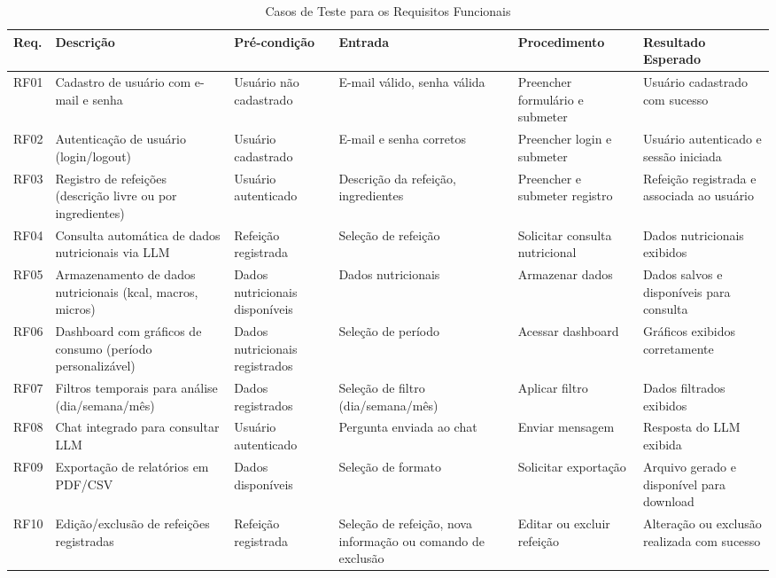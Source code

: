 \begin{longtable}{|p{}|p{}|p{}|p{}|p{}|p{}|}
\caption{Casos de Teste para os Requisitos Funcionais}
\label{tab:casos-teste-reqs-funcionais}\\
\hline
\textbf{Req.} & \textbf{Descrição} & \textbf{Pré-condição} & \textbf{Entrada} & \textbf{Procedimento} & \textbf{Resultado Esperado} \\
\hline
\endfirsthead
\endhead
RF01 & Cadastro de usuário com e-mail e senha & Usuário não cadastrado & E-mail válido, senha válida & Preencher formulário e submeter & Usuário cadastrado com sucesso \\
\hline
RF02 & Autenticação de usuário (login/logout) & Usuário cadastrado & E-mail e senha corretos & Preencher login e submeter & Usuário autenticado e sessão iniciada \\
\hline
RF03 & Registro de refeições (descrição livre ou por ingredientes) & Usuário autenticado & Descrição da refeição, ingredientes & Preencher e submeter registro & Refeição registrada e associada ao usuário \\
\hline
RF04 & Consulta automática de dados nutricionais via LLM & Refeição registrada & Seleção de refeição & Solicitar consulta nutricional & Dados nutricionais exibidos \\
\hline
RF05 & Armazenamento de dados nutricionais (kcal, macros, micros) & Dados nutricionais disponíveis & Dados nutricionais & Armazenar dados & Dados salvos e disponíveis para consulta \\
\hline
RF06 & Dashboard com gráficos de consumo (período personalizável) & Dados nutricionais registrados & Seleção de período & Acessar dashboard & Gráficos exibidos corretamente \\
\hline
RF07 & Filtros temporais para análise (dia/semana/mês) & Dados registrados & Seleção de filtro (dia/semana/mês) & Aplicar filtro & Dados filtrados exibidos \\
\hline
RF08 & Chat integrado para consultar LLM & Usuário autenticado & Pergunta enviada ao chat & Enviar mensagem & Resposta do LLM exibida \\
\hline
RF09 & Exportação de relatórios em PDF/CSV & Dados disponíveis & Seleção de formato & Solicitar exportação & Arquivo gerado e disponível para download \\
\hline
RF10 & Edição/exclusão de refeições registradas & Refeição registrada & Seleção de refeição, nova informação ou comando de exclusão & Editar ou excluir refeição & Alteração ou exclusão realizada com sucesso \\
\hline
\end{longtable}


